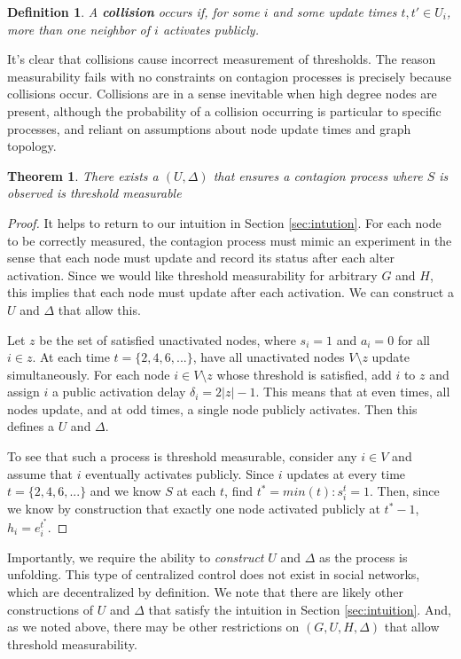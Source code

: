 \documentclass[a4paper]{article}
\newtheorem{definition}{Definition}
\newtheorem{theorem}{Theorem}
\begin{document}
\begin{definition} \label{def:collision}
A \textbf{collision} occurs if, for some $i$ and some update times $t, t' \in U_i$, more than one neighbor of $i$ activates publicly.
\end{definition}

\noindent
It's clear that collisions cause incorrect measurement of thresholds. The reason measurability fails with no constraints on contagion processes is precisely because collisions occur. Collisions are in a sense inevitable when high degree nodes are present, although the probability of a collision occurring is particular to specific processes, and reliant on assumptions about node update times and graph topology.

\begin{theorem} \label{theorem:fast}
There exists a $(U, \Delta)$ that ensures a contagion process where $S$ is observed is threshold measurable
\end{theorem}

\begin{proof}
It helps to return to our intuition in Section \ref{sec:intution}. For each node to be correctly measured, the contagion process must mimic an experiment in the sense that each node must update and record its status after each alter activation. Since we would like threshold measurability for arbitrary $G$ and $H$, this implies that each node must update after each activation. We can construct a $U$ and $\Delta$ that allow this.

Let $z$ be the set of satisfied unactivated nodes, where $s_i = 1$ and $a_i = 0$ for all $i \in z$. At each time $t = \{2, 4, 6, ...\}$, have all unactivated nodes $V \setminus z$ update simultaneously. For each node $i \in V \setminus z$ whose threshold is satisfied, add $i$ to $z$ and assign $i$ a public activation delay $\delta_i = 2|z| - 1$. This means that at even times, all nodes update, and at odd times, a single node publicly activates. Then this defines a $U$ and $\Delta$. 

To see that such a process is threshold measurable, consider any $i \in V$ and assume that $i$ eventually activates publicly. Since $i$ updates at every time $t = \{2, 4, 6, ...\}$ and we know $S$ at each $t$, find $t^* = min(t) : s_i^t = 1$. Then, since we know by construction that exactly one node activated publicly at $t^* - 1$, $h_i = e_i^{t^*}$.
\end{proof}

\noindent
Importantly, we require the ability to \emph{construct} $U$ and $\Delta$ as the process is unfolding. This type of centralized control does not exist in social networks, which are decentralized by definition. We note that there are likely other constructions of $U$ and $\Delta$ that satisfy the intuition in Section \ref{sec:intuition}. And, as we noted above, there may be other restrictions on $(G, U, H, \Delta)$ that allow threshold measurability.
\end{document}
